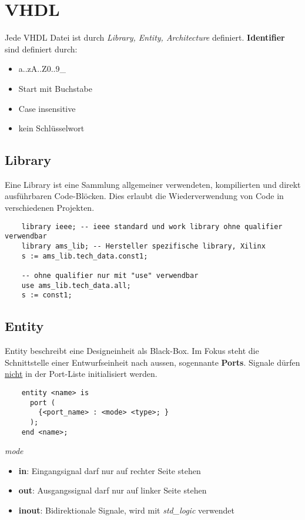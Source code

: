 \section{VHDL}
Jede VHDL Datei ist durch \textit{Library, Entity, Architecture} definiert. \textbf{Identifier} sind definiert durch:
\begin{itemize}[nosep]
	\item a..zA..Z0..9\_
	\item Start mit Buchstabe
	\item Case insensitive
	\item kein Schlüsselwort
\end{itemize}

\subsection{Library}
Eine Library ist eine Sammlung allgemeiner verwendeten, kompilierten und direkt ausführbaren Code-Blöcken. Dies erlaubt die Wiederverwendung von Code in verschiedenen Projekten.

\begin{lstlisting}
	library ieee; -- ieee standard und work library ohne qualifier verwendbar
	library ams_lib; -- Hersteller spezifische library, Xilinx
	s := ams_lib.tech_data.const1;
	
	-- ohne qualifier nur mit "use" verwendbar
	use ams_lib.tech_data.all;
	s := const1;
\end{lstlisting}


\subsection{Entity}
Entity beschreibt eine Designeinheit als Black-Box. Im Fokus steht die Schnittstelle einer Entwurfseinheit nach aussen, sogennante \textbf{Ports}. Signale dürfen \underline{nicht} in der Port-Liste initialisiert werden.

\begin{lstlisting}
	entity <name> is 
	  port (
	    {<port_name> : <mode> <type>; }
	  );
	end <name>;
\end{lstlisting}
\noindent\textit{mode}
\begin{itemize}[nosep]
	\item \textbf{in}: Eingangsignal darf nur auf rechter Seite stehen
	\item \textbf{out}: Ausgangssignal darf nur auf linker Seite stehen
	\item \textbf{inout}: Bidirektionale Signale, wird mit \textit{std\_logic} verwendet
\end{itemize}


